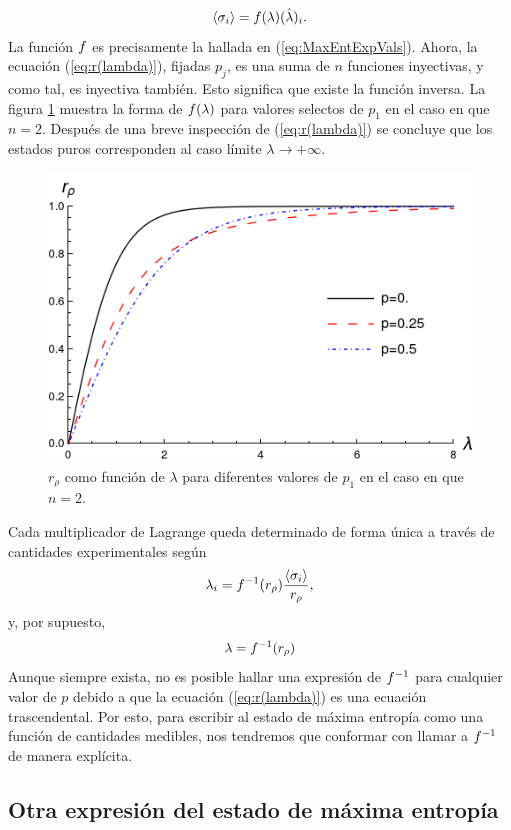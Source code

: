\begin{equation}
    \expval{\sigma_{i}}=f(\lambda)(\hat{\lambda})_{i}.
\end{equation}
La función $f$ es precisamente la hallada en (\ref{eq:MaxEntExpVals}). Ahora, la ecuación (\ref{eq:r(lambda)}), fijadas $p_{j}$, es una suma de $n$ funciones inyectivas, y como tal, es inyectiva también. Esto significa que existe la función inversa. La figura \ref{fig:r(lambda)} muestra la forma de $f(\lambda)$ para valores selectos de $p_{1}$ en el caso en que $n=2$. Después de una breve inspección de (\ref{eq:r(lambda)}) se concluye que los estados puros corresponden al caso límite $\lambda\rightarrow+\infty$.

\begin{figure}[ht]
    \centering
    \includegraphics[width=0.6\linewidth]{chapter2/figures/r(lambda).png}
    \caption{$r_{\rho}$ como función de $\lambda$ para diferentes valores de $p_{1}$ en el caso en que $n=2$.}
    \label{fig:r(lambda)}
\end{figure}
Cada multiplicador de Lagrange queda determinado de forma única a través de cantidades experimentales según 
\begin{equation}
    \lambda_{i}=f^{-1}(r_{\rho}) \frac{\expval{\sigma_{i}}}{r_{\rho}},
\end{equation}
y, por supuesto,
\begin{equation*}
    \lambda=f^{-1}(r_{\rho})
\end{equation*}
Aunque siempre exista, no es posible hallar una expresión de $f^{-1}$ para cualquier valor de $p$ debido a que la ecuación (\ref{eq:r(lambda)}) es una ecuación trascendental. Por esto, para escribir al estado de máxima entropía como una función de cantidades medibles, nos tendremos que conformar con llamar a $f^{-1}$ de manera explícita.

\subsection{Otra expresión del estado de máxima entropía}

